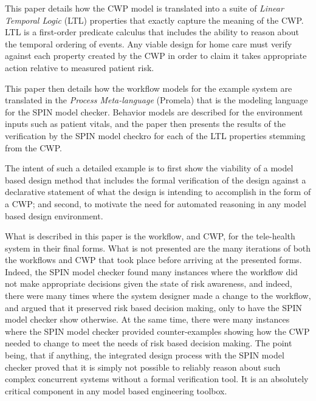 This paper details how the CWP model is translated into a suite of \emph{Linear Temporal Logic} (LTL) properties that exactly capture the meaning of the CWP. LTL is a first-order predicate calculus that includes the ability to reason about the temporal ordering of events. Any viable design for home care must verify against each property created by the CWP in order to claim it takes appropriate action relative to measured patient risk.

This paper then details how the workflow models for the example system are translated in the \emph{Process Meta-language} (Promela) that is the modeling language for the SPIN model checker. Behavior models are described for the environment inputs such as patient vitals, and the paper then presents the results of the verification by the SPIN model checkro for each of the LTL properties stemming from the CWP. 

The intent of such a detailed example is to first show the viability of a model based design method that includes the formal verification of the design against a declarative statement of what the design is intending to accomplish in the form of a CWP; and second, to motivate the need for automated reasoning in any model based design environment.  

What is described in this paper is the workflow, and CWP, for the tele-health system in their final forms. What is not presented are the many iterations of both the workflows and CWP that took place before arriving at the presented forms. Indeed, the SPIN model checker found many instances where the workflow did not make appropriate decisions given the state of risk awareness, and indeed, there were many times where the system designer made a change to the workflow, and argued that it preserved risk based decision making, only to have the SPIN model checker show otherwise. At the same time, there were many instances where the SPIN model checker provided counter-examples showing how the CWP needed to change to meet the needs of risk based decision making. The point being, that if anything, the integrated design process with the SPIN model checker proved that it is simply not possible to reliably reason about such complex concurrent systems without a formal verification tool. It is an absolutely critical component in any model based engineering toolbox.